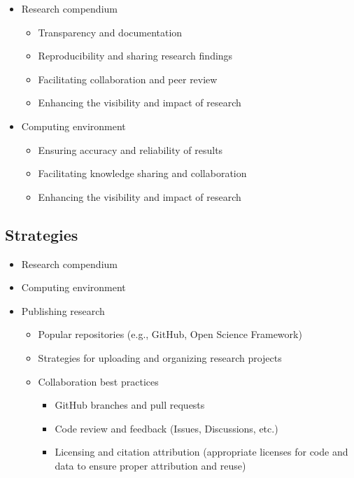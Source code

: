 \documentclass[
  letterpaper,
]{latex/krantz}
\providecommand{\tightlist}{%
  \setlength{\itemsep}{0pt}\setlength{\parskip}{0pt}}\usepackage{longtable,booktabs,array}
\theoremstyle{definition}
\theoremstyle{remark}
\begin{document}
\begin{itemize}
\tightlist
\item
  Research compendium

  \begin{itemize}
  \tightlist
  \item
    Transparency and documentation
  \item
    Reproducibility and sharing research findings
  \item
    Facilitating collaboration and peer review
  \item
    Enhancing the visibility and impact of research
  \end{itemize}
\item
  Computing environment

  \begin{itemize}
  \tightlist
  \item
    Ensuring accuracy and reliability of results
  \item
    Facilitating knowledge sharing and collaboration
  \item
    Enhancing the visibility and impact of research
  \end{itemize}
\end{itemize}

\subsection{Strategies}\label{sec-contr-ro-strategies}

\begin{itemize}
\item
  Research compendium
\item
  Computing environment
\item
  Publishing research

  \begin{itemize}
  \tightlist
  \item
    Popular repositories (e.g., GitHub, Open Science Framework)
  \item
    Strategies for uploading and organizing research projects
  \item
    Collaboration best practices

    \begin{itemize}
    \tightlist
    \item
      GitHub branches and pull requests
    \item
      Code review and feedback (Issues, Discussions, etc.)
    \item
      Licensing and citation attribution (appropriate licenses for code
      and data to ensure proper attribution and reuse)
    \end{itemize}
  \end{itemize}
\end{itemize}
\end{document}
